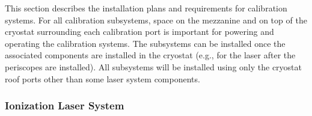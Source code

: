 



This section describes the installation plans and requirements for calibration systems. For all calibration subsystems, space on the mezzanine and on top of the cryostat surrounding each calibration port is important for powering and operating the calibration systems. The subsystems can be installed once the associated components are installed in the cryostat (e.g., for the laser after the periscopes are installed). All subsystems will be installed using only the cryostat roof ports other than some laser system components.

\subsubsection{Ionization Laser System} 



